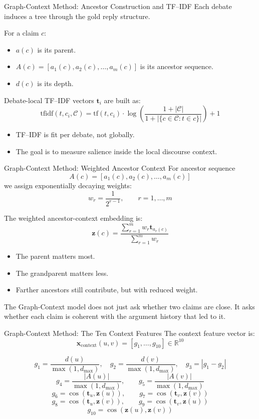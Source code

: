 \documentclass[aspectratio=169, 10pt]{beamer}
\newcommand{\takeawaybox}[2]{%
  \begin{tcolorbox}[colback=accentgreen!10, colframe=accentgreen,
    title={\textbf{Takeaway:} #1}, fonttitle=\bfseries\small,
    left=4pt, right=4pt, top=3pt, bottom=3pt, boxrule=1pt]
    \small #2
  \end{tcolorbox}}
\begin{document}
\begin{frame}[shrink=4]{Graph-Context Method: Ancestor Construction and TF--IDF}
Each debate induces a tree through the gold reply structure.

For a claim \(c\):
\begin{itemize}
  \item \(a(c)\) is its parent.
  \item \(A(c)=[a_1(c),a_2(c),\dots,a_m(c)]\) is its ancestor sequence.
  \item \(d(c)\) is its depth.
\end{itemize}

Debate-local TF--IDF vectors \(\mathbf{t}_i\) are built as:
\[
\mathrm{tfidf}(t,c_i,\mathcal{C}) = \mathrm{tf}(t,c_i)\cdot
\log\left(\frac{1+|\mathcal{C}|}{1+|\{c\in\mathcal{C}: t\in c\}|}\right)+1
\]

\begin{itemize}
  \item TF--IDF is fit per debate, not globally.
  \item The goal is to measure salience inside the local discourse context.
\end{itemize}
\end{frame}

\begin{frame}[shrink=5]{Graph-Context Method: Weighted Ancestor Context}
For ancestor sequence
\[
A(c)=[a_1(c),a_2(c),\dots,a_m(c)]
\]
we assign exponentially decaying weights:
\[
w_r = \frac{1}{2^{r-1}}, \qquad r=1,\dots,m
\]

The weighted ancestor-context embedding is:
\[
\mathbf{z}(c)=
\frac{\sum_{r=1}^{m} w_r \mathbf{t}_{a_r(c)}}{\sum_{r=1}^{m} w_r}
\]

\begin{itemize}
  \item The parent matters most.
  \item The grandparent matters less.
  \item Farther ancestors still contribute, but with reduced weight.
\end{itemize}

\takeawaybox{Core Idea}{
The Graph-Context model does not just ask whether two claims are close. It asks whether each claim is coherent with the argument history that led to it.
}
\end{frame}

\begin{frame}[shrink=8]{Graph-Context Method: The Ten Context Features}
The context feature vector is:
\[
\mathbf{x}_{\mathrm{context}}(u,v)=[g_1,\dots,g_{10}]\in\mathbb{R}^{10}
\]

\[
g_1=\frac{d(u)}{\max(1,d_{\max})},\quad
g_2=\frac{d(v)}{\max(1,d_{\max})},\quad
g_3=|g_1-g_2|
\]
\[
g_4=\frac{|A(u)|}{\max(1,d_{\max})},\qquad
g_5=\frac{|A(v)|}{\max(1,d_{\max})}
\]
\[
g_6=\cos(\mathbf{t}_u,\mathbf{z}(u)),\qquad
g_7=\cos(\mathbf{t}_v,\mathbf{z}(v))
\]
\[
g_8=\cos(\mathbf{t}_u,\mathbf{z}(v)),\qquad
g_9=\cos(\mathbf{t}_v,\mathbf{z}(u))
\]
\[
g_{10}=\cos(\mathbf{z}(u),\mathbf{z}(v))
\]
\end{frame}
\end{document}

